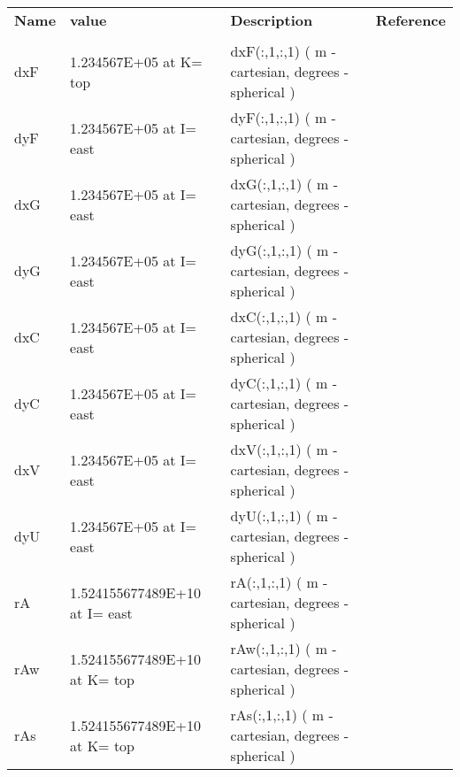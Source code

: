 \newpage
\begin{table}
\begin{tabular}{lllc}

  \textbf{Name}  &  \textbf{value}  
    &  \textbf{Description}   &  \textbf{Reference}  \\
  & & & \\
   dxF   &       1.234567E+05  at K= top
    &   dxF(:,1,:,1) ( m - cartesian, degrees - spherical ) 
    &  %
    \\
   dyF   &      1.234567E+05  at I= east
    &   dyF(:,1,:,1) ( m - cartesian, degrees - spherical ) 
    &  %
    \\
   dxG   &      1.234567E+05   at I= east
    &   dxG(:,1,:,1) ( m - cartesian, degrees - spherical ) 
    &  %
    \\
   dyG   &      1.234567E+05   at I= east
    &   dyG(:,1,:,1) ( m - cartesian, degrees - spherical ) 
    &  %
    \\
   dxC   &      1.234567E+05  at I= east
    &   dxC(:,1,:,1) ( m - cartesian, degrees - spherical ) 
    &  %
    \\
   dyC   &      1.234567E+05  at I= east
    &   dyC(:,1,:,1) ( m - cartesian, degrees - spherical ) 
    &  %
    \\
   dxV   &      1.234567E+05   at I= east
    &   dxV(:,1,:,1) ( m - cartesian, degrees - spherical ) 
    &  %
    \\
   dyU   &      1.234567E+05   at I= east
    &   dyU(:,1,:,1) ( m - cartesian, degrees - spherical ) 
    &  %
    \\
   rA   &      1.524155677489E+10  at I= east
    &   rA(:,1,:,1) ( m - cartesian, degrees - spherical ) 
    &  %
    \\
   rAw   &      1.524155677489E+10   at K= top
    &   rAw(:,1,:,1) ( m - cartesian, degrees - spherical ) 
    &  %
    \\
   rAs   &      1.524155677489E+10   at K= top
    &   rAs(:,1,:,1) ( m - cartesian, degrees - spherical ) 
    &  %
    \\

\end{tabular}
\end{table}


